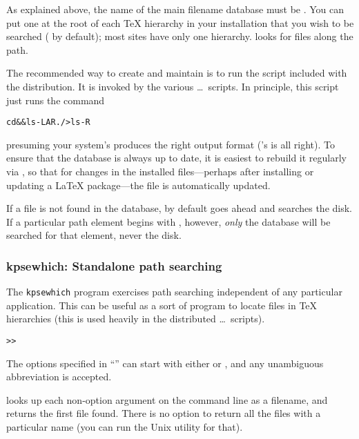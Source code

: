 \documentclass{article}
\def\Dash{---}
\begin{document}
As explained above, the name of the main filename database must be
.  You can put one at the root of each \TeX{} hierarchy in
your installation that you wish to be searched ( by
default); most sites have only one hierarchy.  \KPS{} looks for
 files along the  path.

The recommended way to create and maintain  is to run the
 script included with the distribution. It is invoked
by the various \dots\ scripts.  In principle, this script
just runs the command
\begin{alltt}
cd  && ls -LAR ./ >ls-R
\end{alltt}
presuming your system's  produces the right output format
('s  is all right).  To ensure that the database is always
up to date, it is easiest to rebuild it regularly via , so
that for changes in the installed files\Dash perhaps after installing or
updating a \LaTeX{} package\Dash the file  is automatically
updated.

If a file is not found in the database, by default \KPS{} goes ahead
and searches the disk. If a particular path element begins with
\samp{!!}, however, \emph{only} the database will be searched for that
element, never the disk.


\subsubsection{kpsewhich: Standalone path searching}
\label{Invoking-kpsewhich}

The \texttt{kpsewhich} program exercises path searching independent of any
particular application.  This can be useful as a sort of 
program to locate files in \TeX{} hierarchies (this is used heavily in
the distributed \dots\ scripts).

\begin{alltt}
>> 
\end{alltt}
The options specified in ``\texttt{}'' can start with either \samp{-}
or \samp{-{}-}, and any unambiguous abbreviation is accepted.

\KPS{} looks up each non-option argument on the command line as a
filename, and returns the first file found. There is no option to
return all the files with a particular name (you can run the Unix
 utility for that).
\end{document}
